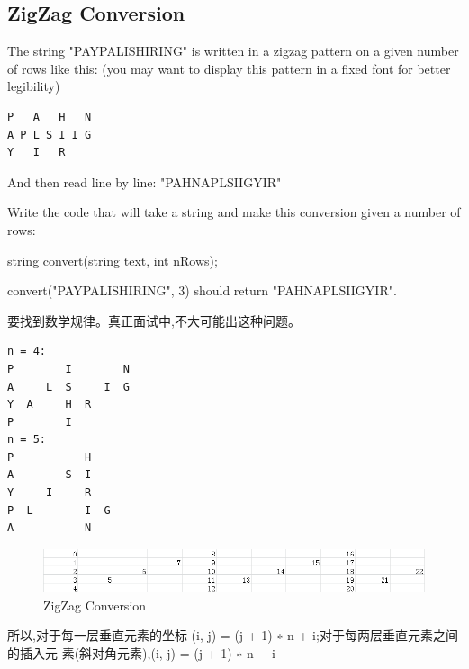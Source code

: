 \documentclass[12pt]{book}
\begin{document}
\subsection{ZigZag Conversion}
\label{sec-20-1-11}
The string "PAYPALISHIRING" is written in a zigzag pattern on a given number of rows like this: (you may want to display this pattern in a fixed font for better legibility)
\lstset{language=java,label= ,caption= ,numbers=none}
\begin{lstlisting}
P   A   H   N
A P L S I I G
Y   I   R
\end{lstlisting}
And then read line by line: "PAHNAPLSIIGYIR"

Write the code that will take a string and make this conversion given a number of rows:

string convert(string text, int nRows);

convert("PAYPALISHIRING", 3) should return "PAHNAPLSIIGYIR".

要找到数学规律。真正面试中,不大可能出这种问题。

\lstset{language=java,label= ,caption= ,numbers=none}
\begin{lstlisting}
n = 4:
P        I        N
A     L  S     I  G
Y  A     H  R
P        I
n = 5:
P           H
A        S  I
Y     I     R
P  L        I  G
A           N
\end{lstlisting}
\begin{figure}[htb]
\centering
\includegraphics[width=.9\linewidth]{./pic/zigzag.png}
\caption{ZigZag Conversion}
\end{figure}

所以,对于每一层垂直元素的坐标 (i, j) = (j + 1) ∗ n + i;对于每两层垂直元素之间的插入元
素(斜对角元素),(i, j) = (j + 1) ∗ n − i
\end{document}
